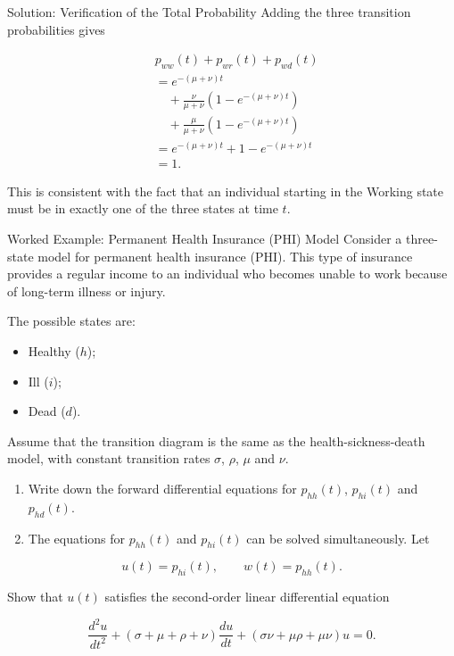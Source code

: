 \documentclass[
  ignorenonframetext,
  aspectratio=169,
]{beamer}
\providecommand{\tightlist}{%
  \setlength{\itemsep}{0pt}\setlength{\parskip}{0pt}}
\begin{document}
\begin{frame}{Solution: Verification of the Total Probability}
\protect{}\label{solution-verification-of-the-total-probability}
Adding the three transition probabilities gives

\[
\begin{aligned}
&p_{ww}(t)+p_{wr}(t)+p_{wd}(t)\\
&=e^{-(\mu+\nu)t}\\
&\quad+\frac{\nu}{\mu+\nu}
\left(1-e^{-(\mu+\nu)t}\right)\\
&\quad+\frac{\mu}{\mu+\nu}
\left(1-e^{-(\mu+\nu)t}\right)\\
&=e^{-(\mu+\nu)t}
+1-e^{-(\mu+\nu)t}\\
&=\boxed{1}.
\end{aligned}
\]

This is consistent with the fact that an individual starting in the
Working state must be in exactly one of the three states at time \(t\).
\end{frame}

\begin{frame}{Worked Example: Permanent Health Insurance (PHI) Model}
\protect{}\label{worked-example-permanent-health-insurance-phi-model}
Consider a three-state model for permanent health insurance (PHI). This
type of insurance provides a regular income to an individual who becomes
unable to work because of long-term illness or injury.

The possible states are:

\begin{itemize}
\tightlist
\item
  Healthy (\(h\));
\item
  Ill (\(i\));
\item
  Dead (\(d\)).
\end{itemize}

Assume that the transition diagram is the same as the
health-sickness-death model, with constant transition rates \(\sigma\),
\(\rho\), \(\mu\) and \(\nu\).

\begin{enumerate}
\tightlist
\item
  Write down the forward differential equations for \(p_{hh}(t)\),
  \(p_{hi}(t)\) and \(p_{hd}(t)\).
\item
  The equations for \(p_{hh}(t)\) and \(p_{hi}(t)\) can be solved
  simultaneously. Let
\end{enumerate}

\[
u(t)=p_{hi}(t),
\qquad
w(t)=p_{hh}(t).
\]

Show that \(u(t)\) satisfies the second-order linear differential
equation

\[
\boxed{
\frac{d^2u}{dt^2}
+(\sigma+\mu+\rho+\nu)\frac{du}{dt}
+(\sigma\nu+\mu\rho+\mu\nu)u=0.
}
\]
\end{frame}
\end{document}
